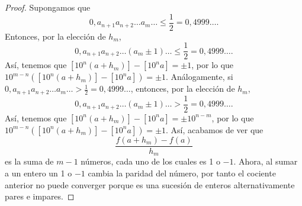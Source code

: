 \begin{proof}
Supongamos que 
\[0,a_{n+1}a_{n+2} \ldots a_{m} \ldots \leq \frac{1}{2} = 0,4999 \ldots .\]
Entonces, por la elección de $\displaystyle h_{m} $,
\[0,a_{n+1}a_{n+2} \ldots \left(a_{m}\pm 1\right) \ldots \leq \frac{1}{2} = 0,4999 \ldots .\]
Así, tenemos que $\displaystyle \left[10^{n}\left(a+h_{m}\right)\right] -\left[10^{n}a\right] = \pm 1 $, por lo que $\displaystyle 10^{m - n}\left(\left[10^{n}\left(a+h_{m}\right)\right] -\left[10^{n}a\right] \right) = \pm 1 $. Análogamente, si $\displaystyle 0,a_{n+1}a_{n+2} \ldots a_{m} \ldots > \frac{1}{2} = 0,4999 \ldots $, entonces, por la elección de $\displaystyle h_{m} $,
\[0,a_{n+1}a_{n+2} \ldots \left(a_{m}\pm 1\right) \ldots > \frac{1}{2} = 0,4999 \ldots .\]
Así, tenemos que $\displaystyle \left[10^{n}\left(a+h_{m}\right)\right] -\left[10^{n}a\right] = \pm 10^{n-m} $, por lo que $\displaystyle 10^{m - n}\left(\left[10^{n}\left(a+h_{m}\right)\right] -\left[10^{n}a\right] \right) = \pm 1 $. Así, acabamos de ver que 
\[\frac{f\left(a+h_{m}\right)-f\left(a\right)}{h_{m}} \]
es la suma de $\displaystyle m - 1 $ números, cada uno de los cuales es 1 o $\displaystyle - 1 $. Ahora, al sumar a un entero un 1 o $\displaystyle - 1 $ cambia la paridad del número, por tanto el cociente anterior no puede converger porque es una sucesión de enteros alternativamente pares e impares.
\end{proof}

